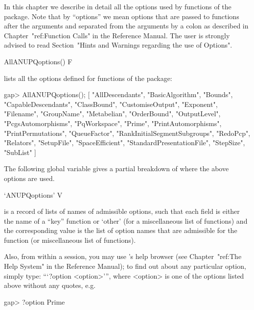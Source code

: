 

In this chapter we describe in detail all the options used  by  functions
of the {\ANUPQ} package. Note that by ``options'' we mean {\GAP}  options
that are passed to functions after the arguments and separated  from  the
arguments by a colon as described in Chapter~"ref:Function Calls" in  the
Reference Manual. The user is strongly advised to read Section~"Hints and
Warnings regarding the use of Options".

\>AllANUPQoptions() F

lists all the {\GAP}  options  defined  for  functions  of  the  {\ANUPQ}
package:

\beginexample
gap> AllANUPQoptions();
[ "AllDescendants", "BasicAlgorithm", "Bounds", "CapableDescendants", 
  "ClassBound", "CustomiseOutput", "Exponent", "Filename", "GroupName", 
  "Metabelian", "OrderBound", "OutputLevel", "PcgsAutomorphisms", 
  "PqWorkspace", "Prime", "PrintAutomorphisms", "PrintPermutations", 
  "QueueFactor", "RankInitialSegmentSubgroups", "RedoPcp", "Relators", 
  "SetupFile", "SpaceEfficient", "StandardPresentationFile", "StepSize", 
  "SubList" ]
\endexample

The following global variable gives a  partial  breakdown  of  where  the
above options are used.

\>`ANUPQoptions' V

is a record of lists of names of admissible {\ANUPQ} options, such  that
each field is either the name of a ``key'' {\ANUPQ} function  or  `other'
(for a miscellaneous list of functions) and the  corresponding  value  is
the list of option  names  that  are  admissible  for  the  function  (or
miscellaneous list of functions).

Also, from within a {\GAP} session, you may  use  {\GAP}'s  help  browser
(see Chapter~"ref:The Help System" in the {\GAP}  Reference  Manual);  to
find out about any particular {\ANUPQ} option,  simply  type:  ```?option
<option>''', where <option> is one of the options  listed  above  without
any quotes, e.g.

\begintt
gap> ?option Prime
\endtt

